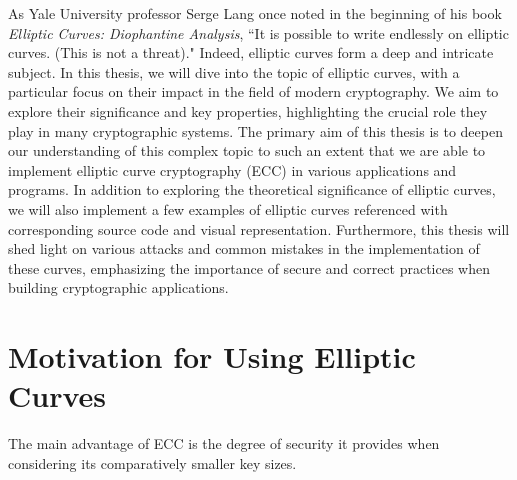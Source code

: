 \documentclass[bp,en]{FEIstyle}
\begin{document}
As Yale University professor Serge Lang once noted in the beginning of his book \textit{Elliptic Curves: Diophantine Analysis}, ``It is possible to write endlessly on elliptic curves. (This is not a threat)." Indeed, elliptic curves form a deep and intricate subject. In this thesis, we will dive into the topic of elliptic curves, with a particular focus on their impact in the field of modern cryptography. We aim to explore their significance and key properties, highlighting the crucial role they play in many cryptographic systems. The primary aim of this thesis is to deepen our understanding of this complex topic to such an extent that we are able to implement elliptic curve cryptography (ECC) in various applications and programs. In addition to exploring the theoretical significance of elliptic curves, we will also implement a few examples of elliptic curves referenced with corresponding source code and visual representation. Furthermore, this thesis will shed light on various attacks and common mistakes in the implementation of these curves, emphasizing the importance of secure and correct practices when building cryptographic applications.

\section*{Motivation for Using Elliptic Curves}

The main advantage of ECC is the degree of security it provides when considering its comparatively smaller key sizes.

\end{document}
